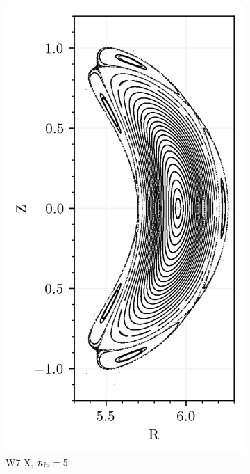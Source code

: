 \begin{figure}[H]
    \centering
    \begin{subfigure}[c]{0.32\textwidth}
        \centering
        \includegraphics[width=\textwidth]{images/theory/w7x.png}
        \caption{W7-X, $n_\text{fp} = 5$}
        \label{fig:w7x-default}
    \end{subfigure}
    \hfill
    \begin{subfigure}[c]{0.32\textwidth}

\end{subfigure}
\end{figure}
